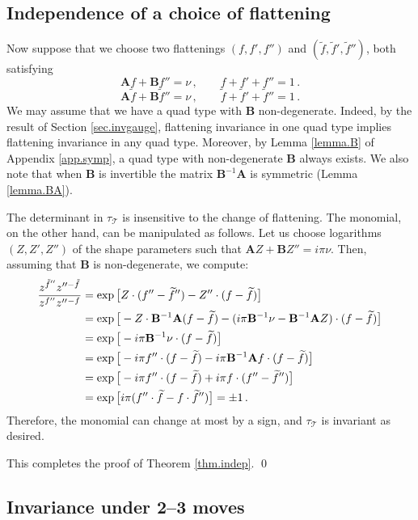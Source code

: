 \documentclass[12pt]{amsart}
\newcommand{\lbl}{\label}
\renewcommand{\eta}{\nu}
\theoremstyle{definition}
\def\be{  \begin{equation} }
\def\ee{  \end{equation} }
\newcommand{\CT}{\mathcal{T}}
\newcommand{\wt}{\widetilde}
\newcommand{\mb}{\mathbf}
\numberwithin{equation}{section}
\begin{document}
\subsection{Independence of a choice of flattening}
\lbl{sec.invflat}

Now suppose that we choose two flattenings $(f,f',f'')$ 
and $(\wt f,\wt f',\wt f'')$, both satisfying
%
\be 
\mb A  f  + \mb B f'' = \eta\,,\qquad 
f+ f'+ f''=1\,. \ee
%
%
\be 
\mb A \wt f  + \mb B\wt f'' = \eta\,,\qquad 
\wt f+\wt f'+\wt f''=1\,. \ee
%
We may assume that we have a quad type with $\mb B$ non-degenerate. Indeed, by the result of Section \ref{sec.invgauge}, flattening invariance in one quad type implies flattening invariance in any quad type. Moreover, by Lemma \ref{lemma.B} of Appendix \ref{app.symp}, a quad type with non-degenerate $\mb B$ always exists. We also note that when $\mb B$ is invertible the matrix $\mb B^{-1}\mb A$ is symmetric (Lemma \ref{lemma.BA}).



The determinant in $\tau_{\CT}$ is insensitive to the change of 
flattening. The monomial, on the other hand, can be manipulated as follows. 
Let us choose logarithms $(Z,Z',Z'')$ of the shape parameters such that 
$\mb A Z+\mb B Z''=i\pi \eta$. 
Then, assuming that $\mb B$ is non-degenerate, we compute:
%
\begin{align} \frac{z^{\tilde f''}z''^{-\tilde f}}{z^{f''}z''{}^{-f}}
 &= \exp\big[ Z\cdot (f''-\wt f'')-Z''\cdot (f-\wt f) \big] \notag\\
 &= \exp\big[ -Z\cdot \mb B^{-1}\mb A(f-\wt f)
-(i\pi \mb B^{-1}\eta-\mb B^{-1}\mb A Z)\cdot (f-\wt f)\big] \notag\\
 &= \exp\big[-i\pi \mb B^{-1}\eta\cdot (f-\wt f)\big] \notag \\
 &= \exp\big[-i\pi f''\cdot(f-\wt f)
-i\pi \mb B^{-1}\mb A f\cdot(f-\wt f)\big] \notag\\
 &= \exp\big[-i\pi f''\cdot(f-\wt f)+i\pi  f\cdot(f''-\wt f'')\big] \notag \\
 &= \exp\big[i\pi (f''\cdot \wt f- f\cdot\wt f'')\big] = \pm 1\,. \notag
\end{align}
%
Therefore, the monomial can change at most by a sign, and $\tau_{\CT}$ is 
invariant as desired.

This completes the proof of Theorem \ref{thm.indep}.
\qed






\subsection{Invariance under 2--3 moves}
\lbl{sec.inv23}
\end{document}
